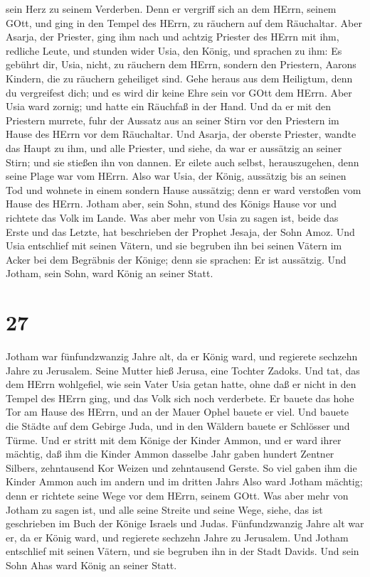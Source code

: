 sein Herz zu seinem Verderben. Denn er vergriff sich an dem HErrn,
seinem GOtt, und ging in den Tempel des HErrn, zu räuchern auf dem
Räuchaltar.  Aber Asarja, der Priester, ging ihm nach und
achtzig Priester des HErrn mit ihm, redliche Leute,  und
stunden wider Usia, den König, und sprachen zu ihm: Es gebührt dir,
Usia, nicht, zu räuchern dem HErrn, sondern den Priestern, Aarons
Kindern, die zu räuchern geheiliget sind. Gehe heraus aus dem Heiligtum,
denn du vergreifest dich; und es wird dir keine Ehre sein vor GOtt dem
HErrn.  Aber Usia ward zornig; und hatte ein Räuchfaß in
der Hand. Und da er mit den Priestern murrete, fuhr der Aussatz aus an
seiner Stirn vor den Priestern im Hause des HErrn vor dem Räuchaltar.
 Und Asarja, der oberste Priester, wandte das Haupt zu ihm,
und alle Priester, und siehe, da war er aussätzig an seiner Stirn; und
sie stießen ihn von dannen. Er eilete auch selbst, herauszugehen, denn
seine Plage war vom HErrn.  Also war Usia, der König,
aussätzig bis an seinen Tod und wohnete in einem sondern Hause
aussätzig; denn er ward verstoßen vom Hause des HErrn. Jotham aber, sein
Sohn, stund des Königs Hause vor und richtete das Volk im Lande.
 Was aber mehr von Usia zu sagen ist, beide das Erste und
das Letzte, hat beschrieben der Prophet Jesaja, der Sohn Amoz.
 Und Usia entschlief mit seinen Vätern, und sie begruben
ihn bei seinen Vätern im Acker bei dem Begräbnis der Könige; denn sie
sprachen: Er ist aussätzig. Und Jotham, sein Sohn, ward König an seiner
Statt.

\hypertarget{section-26}{%
\section{27}\label{section-26}}

 Jotham war fünfundzwanzig Jahre alt, da er König ward, und
regierete sechzehn Jahre zu Jerusalem. Seine Mutter hieß Jerusa, eine
Tochter Zadoks.  Und tat, das dem HErrn wohlgefiel, wie sein
Vater Usia getan hatte, ohne daß er nicht in den Tempel des HErrn ging,
und das Volk sich noch verderbete.  Er bauete das hohe Tor
am Hause des HErrn, und an der Mauer Ophel bauete er viel. 
Und bauete die Städte auf dem Gebirge Juda, und in den Wäldern bauete er
Schlösser und Türme.  Und er stritt mit dem Könige der
Kinder Ammon, und er ward ihrer mächtig, daß ihm die Kinder Ammon
dasselbe Jahr gaben hundert Zentner Silbers, zehntausend Kor Weizen und
zehntausend Gerste. So viel gaben ihm die Kinder Ammon auch im andern
und im dritten Jahrs  Also ward Jotham mächtig; denn er
richtete seine Wege vor dem HErrn, seinem GOtt.  Was aber
mehr von Jotham zu sagen ist, und alle seine Streite und seine Wege,
siehe, das ist geschrieben im Buch der Könige Israels und Judas.
 Fünfundzwanzig Jahre alt war er, da er König ward, und
regierete sechzehn Jahre zu Jerusalem.  Und Jotham
entschlief mit seinen Vätern, und sie begruben ihn in der Stadt Davids.
Und sein Sohn Ahas ward König an seiner Statt.

